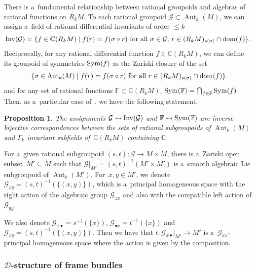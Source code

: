 \documentclass[pdftex]{sigma}
\numberwithin{equation}{section}
\newtheorem{Proposition}[Theorem]{Proposition}
\theoremstyle{definition}
\begin{document}
There is a~fundamental relationship between rational groupoids and algebras of rational functions on $R_kM$. To each rational groupoid $\mathcal G\subset \operatorname{Aut}_k(M)$, we can assign a~field of rational differential invariants of order $\leq k$
\[{\rm Inv}(\mathcal G) = \{f \in \mathbb C(R_kM)\mid
f(r) = f(\sigma\circ r) \mbox{ for all } \sigma\in \mathcal G,\, r \in (R_kM)_{s(\sigma)} \cap {\rm dom}(f)\}.
\]
Reciprocally, for any rational differential function $f\in \mathbb C(R_kM)$, we can define its groupoid of symmetries ${\rm Sym}(f)$ as the Zariski closure of the set
\[
\{\sigma\in \operatorname{Aut}_k(M) \mid f(r) = f(\sigma\circ r) \mbox{ for all } r\in (R_kM)_{s(\sigma)}\cap {\rm dom}(f)\}
\]
and for any set of rational functions $\mathbb F\subset \mathbb C(R_kM)$,
${\rm Sym}(\mathbb F) = \bigcap_{f\in \mathbb F} {\rm Sym}(f)$.
Then, as a~particular case of~\cite[Proposition~2.18]{bcd2019differential}, we have the following statement.

\begin{Proposition}
 The assignments $\mathcal G \leadsto {\rm Inv}(\mathcal G)$ and $\mathbb F\leadsto {\rm Sym}(\mathbb F)$ are inverse bijective correspondences between the sets of rational subgroupoids of $\operatorname{Aut}_k(M)$ and $\Gamma_k$ invariant subfields of~$\mathbb C(R_kM)$ containing $\mathbb C$.
\end{Proposition}

For a~given rational subgroupoid $(s,t)\colon \mathcal G\to M\times M$, there is a~Zariski open subset~${M'\subseteq M}$ such that $\mathcal G|_{M'} = (s,t)^{-1}(M'\times M')$ is a~smooth algebraic Lie subgroupoid of $\operatorname{Aut}_k(M')$. For~${x,y\in M'}$, we denote $\mathcal G_{xy} = (s,t)^{-1}(\{(x,y)\})$, which is a~principal homogeneous space with the right action of the algebraic group $\mathcal G_{xx}$ and also with the compatible left action of $\mathcal G_{yy}$.

We also denote $\mathcal G_{x \bullet} = s^{-1}(\{x\})$, $\mathcal G_{\bullet x} = t^{-1}(\{x\})$ and $\mathcal G_{xy} = (s,t)^{-1}(\{(x,y)\})$. Then we have that $t\colon \mathcal G_{x\bullet}|_{M'}\to M'$ is a~$\mathcal G_{xx}$-principal homogeneous space where the action is given by the composition.

\subsubsection[D-structure of frame bundles]{$\boldsymbol{\mathcal D}$-structure of frame bundles}
\end{document}
